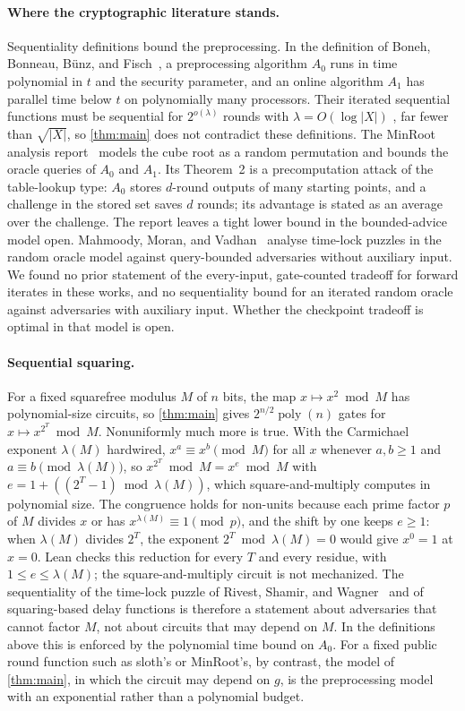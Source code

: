 \documentclass[11pt]{article}
\theoremstyle{definition}
\theoremstyle{remark}
\newcommand{\poly}{\operatorname{poly}}
\numberwithin{equation}{section}
\begin{document}
\paragraph{Where the cryptographic literature stands.}
Sequentiality definitions bound the preprocessing.  In the definition of
Boneh, Bonneau, B\"unz, and Fisch~\cite[Definition~4]{BBBF18}, a
preprocessing algorithm $A_0$ runs in time polynomial in $t$ and the
security parameter, and an online algorithm $A_1$ has parallel time below
$t$ on polynomially many processors.  Their iterated sequential functions
must be sequential for $2^{o(\lambda)}$ rounds with $\lambda=O(\log|X|)$
\cite[Definition~7]{BBBF18}, far fewer than $\sqrt{|X|}$, so
\cref{thm:main} does not contradict these definitions.  The MinRoot
analysis report~\cite[Chapter~4]{MinRoot23} models the cube root as a
random permutation and bounds the oracle queries of $A_0$ and $A_1$.  Its
Theorem~2 is a precomputation attack of the table-lookup type: $A_0$
stores $d$-round outputs of many starting points, and a challenge in the
stored set saves $d$ rounds; its advantage is stated as an average over
the challenge.  The report leaves a tight lower bound in the
bounded-advice model open.  Mahmoody, Moran, and Vadhan~\cite{MMV11}
analyse time-lock puzzles in the random oracle model against
query-bounded adversaries without auxiliary input.  We found no prior
statement of the every-input, gate-counted tradeoff for forward iterates
in these works, and no sequentiality bound for an iterated random oracle
against adversaries with auxiliary input.  Whether the checkpoint tradeoff
is optimal in that model is open.

\paragraph{Sequential squaring.}
For a fixed squarefree modulus $M$ of $n$ bits, the map $x\mapsto x^2\bmod M$
has polynomial-size circuits, so \cref{thm:main} gives $2^{n/2}\poly(n)$
gates for $x\mapsto x^{2^T}\bmod M$.  Nonuniformly much more is true.
With the Carmichael exponent $\lambda(M)$ hardwired, $x^a\equiv x^b\pmod M$
for all $x$ whenever $a,b\geq1$ and $a\equiv b\pmod{\lambda(M)}$, so
$x^{2^T}\bmod M=x^e\bmod M$ with $e=1+((2^T-1)\bmod\lambda(M))$, which
square-and-multiply computes in polynomial size.  The congruence holds
for non-units because each prime factor $p$ of $M$ divides $x$ or has
$x^{\lambda(M)}\equiv1\pmod p$, and the shift by one keeps $e\geq1$: when
$\lambda(M)$ divides $2^T$, the exponent $2^T\bmod\lambda(M)=0$ would
give $x^0=1$ at $x=0$.  Lean checks this reduction for every $T$ and
every residue, with $1\leq e\leq\lambda(M)$; the square-and-multiply
circuit is not mechanized.  The sequentiality of
the time-lock puzzle of Rivest, Shamir, and Wagner~\cite{RSW96} and of
squaring-based delay functions is therefore a statement about adversaries
that cannot factor $M$, not about circuits that may depend on $M$.  In the
definitions above this is enforced by the polynomial time bound on $A_0$.
For a fixed public round function such as sloth's or MinRoot's, by
contrast, the model of \cref{thm:main}, in which the circuit may depend on
$g$, is the preprocessing model with an exponential rather than a
polynomial budget.
\end{document}
